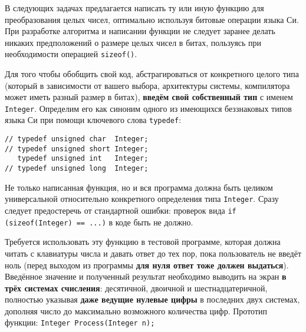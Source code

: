 
В следующих задачах предлагается написать ту или иную функцию для
преобразования целых чисел, оптимально используя битовые операции языка Си.
При разработке алгоритма и написании функции не следует заранее делать никаких
предположений о размере целых чисел в битах, пользуясь при необходимости
операцией \texttt{sizeof()}.

Для того чтобы обобщить свой код, абстрагироваться от конкретного целого типа
(который в зависимости от вашего выбора, архитектуры системы, компилятора
может иметь разный размер в битах), \textbf{введём свой собственный тип} с
именем \texttt{Integer}. Определим его как синоним одного из имеющихся
беззнаковых типов языка Си при помощи ключевого слова \texttt{typedef}:

\medskip
\begin{verbatim}
// typedef unsigned char  Integer;
// typedef unsigned short Integer;
   typedef unsigned int   Integer;
// typedef unsigned long  Integer;
\end{verbatim}
\medskip

Не только написанная функция, но и вся программа должна быть целиком
универсальной относительно конкретного определения типа \texttt{Integer}.
Сразу следует предостеречь от стандартной ошибки: проверок вида
\texttt{if (sizeof(Integer) == ...)} в коде быть не должно.

Требуется использовать эту функцию в тестовой программе, которая должна читать
с клавиатуры числа и давать ответ до тех пор, пока пользователь не введёт ноль
(перед выходом из программы \textbf{для нуля ответ тоже должен выдаться}).
Введённое значение и полученный результат необходимо выводить на экран
\textbf{в трёх системах счисления}: десятичной, двоичной и шестнадцатеричной,
полностью указывая \textbf{даже ведущие нулевые цифры} в последних двух
системах, дополняя число до максимально возможного количества цифр.
Прототип функции: \texttt{Integer Process(Integer n);}


\zzsectionCOMMENTS

